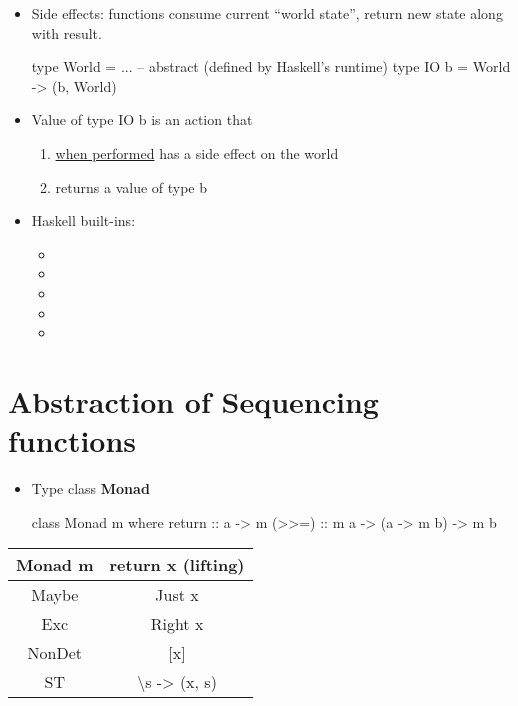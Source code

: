 \begin{itemize}
    \item Side effects: functions consume current ``world state'', return new state along with result.
\begin{codebox}[haskell]
type World = ... -- abstract (defined by Haskell's runtime)
type IO b = World -> (b, World)
\end{codebox}
    \item Value of type IO b is an action that
    \begin{enumerate}
        \item \underline{when performed} has a side effect on the world
        \item returns a value of type b
    \end{enumerate}
    \item Haskell built-ins:
    \begin{itemize}
        \item {}
        \item {}
        \item {}
        \item {}
        \item {}
    \end{itemize}
\end{itemize}


\section{Abstraction of Sequencing functions}


\begin{itemize}
    \item Type class \textbf{Monad}
\begin{codebox}[haskell]
class Monad m where
    return :: a -> m 
    (>>=) :: m a -> (a -> m b) -> m b
\end{codebox}
\end{itemize}

\vspace{9pt}\begin{center}\begin{tabular}{|c|c|}\hline
\rowcolor{grau} Monad m             & return x (lifting)    \\\hline
                Maybe               & Just x                \\\hline
                Exc                 & Right x               \\\hline
                NonDet              & [x]                   \\\hline
                ST                  & \textbackslash s -> (x, s)          \\\hline
\end{tabular}\end{center}\vspace{9pt}

